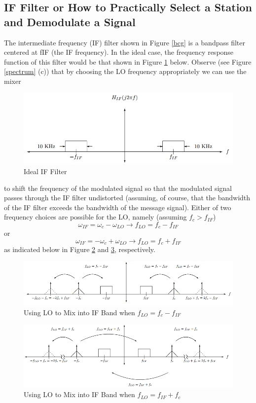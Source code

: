\documentclass{article}
\begin{document}
\subsection{IF Filter or How to Practically Select a Station and Demodulate a Signal}
The intermediate frequency (IF) filter shown in Figure \ref{bcg} is a bandpass filter centered at fIF (the IF frequency). In the ideal case, the frequency response function of this filter would be that shown in Figure \ref{idealif} below. Observe (see Figure \ref{spectrum} (c)) that by choosing the LO frequency appropriately we can use the mixer
\begin{figure}[htbp]
	\centering
	\includegraphics[width=0.7\linewidth]{fig7.png}
	\caption{Ideal IF Filter}
	\label{idealif}
\end{figure}
to shift the frequency of the modulated signal so that the modulated signal passes through the IF filter undistorted (assuming, of course, that the bandwidth of the IF filter exceeds the bandwidth of the message signal). Either of two frequency choices are possible for the LO, namely (assuming $f_c > f_{IF}$)
$$\omega_{IF} = \omega_c-\omega_{LO}\rightarrow f_{LO} = f_c-f_{IF}$$
or
$$\omega_{IF} = -\omega_c+\omega_{LO}\rightarrow f_{LO} = f_c+f_{IF}$$
as indicated below in Figure \ref{LO-IF-} and \ref{LO-IF+}, respectively.\\
\begin{figure}[htbp]
	\centering
	\includegraphics[width=0.7\linewidth]{fig8.png}
	\caption{Using LO to Mix into IF Band when $f_{LO} = f_c − f_{IF}$}
	\label{LO-IF-}
\end{figure}
\begin{figure}[htbp]
	\centering
	\includegraphics[width=0.7\linewidth]{fig9.png}
	\caption{Using LO to Mix into IF Band when $f_{LO} = f_{IF} + f_c$}
	\label{LO-IF+}
\end{figure}
\end{document}
